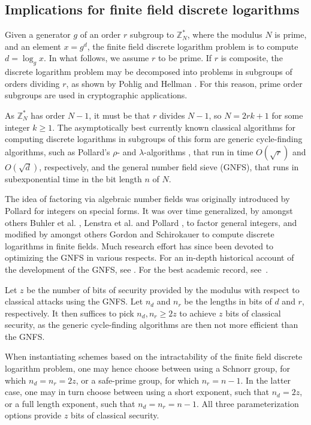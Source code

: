 \documentclass[superscriptaddress,notitlepage,longbibliography]{revtex4-1}
\theoremstyle{definition}
\theoremstyle{definition}
\newcommand{\gen}{g}
\begin{document}
\subsection{Implications for finite field discrete logarithms}
Given a generator $\gen$ of an order $r$ subgroup to $\mathbb Z^*_N$, where the modulus $N$ is prime, and an element $x = \gen^d$, the finite field discrete logarithm problem is to compute $d = \log_{\gen} x$. In what follows, we assume $r$ to be prime. If $r$ is composite, the discrete logarithm problem may be decomposed into problems in subgroups of orders dividing $r$, as shown by Pohlig and Hellman \cite{pohlig-hellman}. For this reason, prime order subgroups are used in cryptographic applications.

As $\mathbb Z_N^*$ has order $N-1$, it must be that $r$ divides $N-1$, so $N = 2rk+1$ for some integer $k \ge 1$. The asymptotically best currently known classical algorithms for computing discrete logarithms in subgroups of this form are generic cycle-finding algorithms, such as Pollard's $\rho$- and $\lambda$-algorithms \cite{pollard-rho-lambda}, that run in time $O(\sqrt{r})$ and $O(\sqrt{d})$, respectively, and the general number field sieve (GNFS), that runs in subexponential time in the bit length $n$ of $N$.

The  idea of factoring via algebraic number fields was originally introduced by Pollard \cite{pollard-cubic} for integers on special forms. It was over time generalized, by amongst others Buhler et al. \cite{buhler-nfs}, Lenstra et al. \cite{lenstra-nfs} and Pollard \cite{pollard-nfs-sieving}, to factor general integers, and modified by amongst others Gordon \cite{gordon} and Schirokauer \cite{schirokauer-thesis, schirokauer} to compute discrete logarithms in finite fields. Much research effort has since been devoted to optimizing the GNFS in various respects. For an in-depth historical account of the development of the GNFS, see \cite{nfs-book, pomerance1996atale}. For the best academic record, see~\cite{boudot-rsa829}.

Let $z$ be the number of bits of security provided by the modulus with respect to classical attacks using the GNFS. Let $n_d$ and $n_r$ be the lengths in bits of $d$ and $r$, respectively. It then suffices to pick $n_d, n_r \ge 2z$ to achieve $z$ bits of classical security, as the generic cycle-finding algorithms are then not more efficient than the GNFS.

When instantiating schemes based on the intractability of the finite field discrete logarithm problem, one may hence choose between using a Schnorr group, for which $n_d = n_r = 2z$, or a safe-prime group, for which $n_r = n - 1$. In the latter case, one may in turn choose between using a short exponent, such that $n_d = 2z$, or a full length exponent, such that $n_d = n_r = n - 1$. All three parameterization options provide $z$ bits of classical security.
\end{document}
